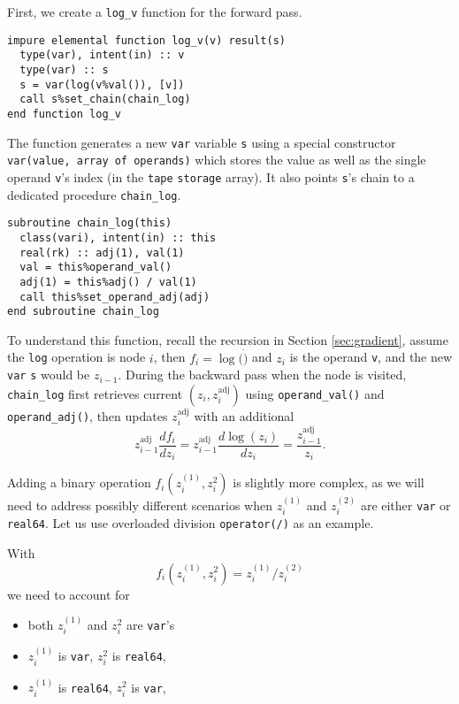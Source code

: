 \documentclass[12pt, reqno, oneside]{amsbook}
\numberwithin{equation}{chapter}
\begin{document}
First, we create a \texttt{log\_v} function for the forward pass.
\begin{verbatim}
impure elemental function log_v(v) result(s)
  type(var), intent(in) :: v
  type(var) :: s
  s = var(log(v%val()), [v])
  call s%set_chain(chain_log)
end function log_v
\end{verbatim}
The function generates a new \texttt{var} variable \texttt{s} using a special
constructor \texttt{var(value, array of operands)} which stores the value as
well as the single operand \texttt{v}'s index (in the \texttt{tape} \texttt{storage}
array). It also points \texttt{s}'s chain to a dedicated procedure \texttt{chain\_log}.
\begin{verbatim}
subroutine chain_log(this)
  class(vari), intent(in) :: this
  real(rk) :: adj(1), val(1)
  val = this%operand_val()
  adj(1) = this%adj() / val(1)
  call this%set_operand_adj(adj)
end subroutine chain_log
\end{verbatim}
To understand this function, recall the recursion in Section \ref{sec:gradient},
assume the \texttt{log} operation is node \(i\), then \(f_i=\log(\dot)\) and
\(z_i\) is the operand \texttt{v}, and the new \texttt{var} \texttt{s} would be
\(z_{i-1}\). During the backward pass when the node is visited, \texttt{chain\_log} 
first retrieves current \((z_i, z_i^{\text{adj}})\)
using \texttt{operand\_val()} and \texttt{operand\_adj()}, then updates
\(z_i^{\text{adj}}\) with an additional
\begin{equation*}
z_{i-1}^{\text{adj}} \frac{df_i}{dz_i} = z_{i-1}^{\text{adj}}\frac{d\log(z_i)}{dz_i}=\frac{z_{i-1}^{\text{adj}}}{z_i}.
\end{equation*}

Adding a binary operation \(f_i(z_i^{(1)}, z_i^{2})\) is slightly more complex, as we will need to
address possibly different scenarios when \(z_i^{(1)}\) and \(z_i^{(2)}\)
are either \texttt{var} or \texttt{real64}. Let us use overloaded division \texttt{operator(/)} as an example.

With
\begin{equation*}
f_i(z_i^{(1)}, z_i^{2}) = z_i^{(1)} / z_i^{(2)}
\end{equation*}
we need to account for
\begin{itemize}
\item both \(z_i^{(1)}\) and \(z_i^{2}\) are \texttt{var}'s
\item \(z_i^{(1)}\) is \texttt{var}, \(z_i^{2}\) is \texttt{real64},
\item \(z_i^{(1)}\) is \texttt{real64}, \(z_i^{2}\) is \texttt{var},
\end{itemize}
\end{document}

